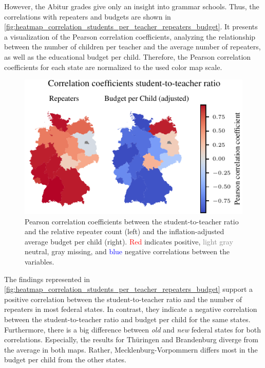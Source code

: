However, the Abitur grades give only an insight into grammar schools. Thus, the correlations with repeaters and budgets are shown in \autoref{fig:heatmap_correlation_students_per_teacher_repeaters_budget}. It presents a visualization of the Pearson correlation coefficients, analyzing the relationship between the number of children per teacher and the average number of repeaters, as well as the educational budget per child. Therefore, the Pearson correlation coefficients for each state are normalized to the used color map scale.

\begin{figure}[ht]
    \centering
    \includegraphics{fig/fig_heatmap_correlation_students_per_teacher_repeaters_budget.pdf}
    \caption{Pearson correlation coefficients between the student-to-teacher ratio and the relative repeater count (left) and the inflation-adjusted average budget per child (right). \textcolor{red}{Red} indicates positive, \textcolor{gray}{light gray} neutral, \textcolor{TUdark}{gray} missing, and \textcolor{blue}{blue} negative correlations between the variables.}
    \label{fig:heatmap_correlation_students_per_teacher_repeaters_budget}
\end{figure}

The findings represented in \autoref{fig:heatmap_correlation_students_per_teacher_repeaters_budget} support a  positive correlation between the student-to-teacher ratio and the number of repeaters in most federal states. In contrast, they indicate a negative correlation between the student-to-teacher ratio  and budget per child for the same states. Furthermore, there is a big difference between \emph{old} and \emph{new} federal states for both correlations. Especially, the results for Thüringen and Brandenburg diverge from the average in both maps. Rather, Mecklenburg-Vorpommern differs most in the budget per child from the other states.

